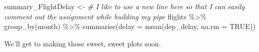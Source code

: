 \documentclass[
]{article}
\newenvironment{Shaded}{\begin{snugshade}}{\end{snugshade}}
\newcommand{\AttributeTok}[1]{\textcolor[rgb]{0.77,0.63,0.00}{#1}}
\newcommand{\CommentTok}[1]{\textcolor[rgb]{0.56,0.35,0.01}{\textit{#1}}}
\newcommand{\ConstantTok}[1]{\textcolor[rgb]{0.00,0.00,0.00}{#1}}
\newcommand{\FunctionTok}[1]{\textcolor[rgb]{0.00,0.00,0.00}{#1}}
\newcommand{\NormalTok}[1]{#1}
\newcommand{\OtherTok}[1]{\textcolor[rgb]{0.56,0.35,0.01}{#1}}
\newcommand{\SpecialCharTok}[1]{\textcolor[rgb]{0.00,0.00,0.00}{#1}}
\begin{document}
\begin{Shaded}
\begin{Highlighting}[]
\NormalTok{summary\_FlightDelay }\OtherTok{\textless{}{-}} \CommentTok{\# I like to use a new line here so that I can easily comment out the assignment while building my pipe}
\NormalTok{  flights }\SpecialCharTok{\%\textgreater{}\%}
  \FunctionTok{group\_by}\NormalTok{(month) }\SpecialCharTok{\%\textgreater{}\%}
  \FunctionTok{summarise}\NormalTok{(}\AttributeTok{delay =} \FunctionTok{mean}\NormalTok{(dep\_delay, }\AttributeTok{na.rm =} \ConstantTok{TRUE}\NormalTok{))}
\end{Highlighting}
\end{Shaded}

We'll get to making those sweet, sweet plots soon.
\end{document}
